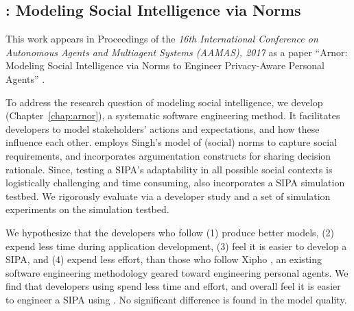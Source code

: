 \subsection[Modeling Social Intelligence via Norms]{\frameworkA: Modeling Social Intelligence via Norms}

This work appears in Proceedings of the \emph{16th International Conference on Autonomous Agents and Multiagent Systems (AAMAS), 2017} as a paper ``Arnor: Modeling Social Intelligence via Norms to Engineer Privacy-Aware Personal Agents'' \citep{Ajmeri-AAMAS17-Arnor}.

To address the research question of modeling social intelligence, we
develop \frameworkA (Chapter~\ref{chap:arnor}), a systematic 
software engineering method. It facilitates developers to model stakeholders' actions
and expectations, and how these influence each other. \frameworkA
employs Singh's  model of (social) norms to
capture social requirements, and incorporates argumentation constructs
\citep{BenchCapon-2007-Argumentation+AI} for sharing decision rationale.
Since, testing a SIPA's adaptability in all possible social contexts is
logistically challenging and time consuming, \frameworkA also
incorporates a SIPA simulation testbed. We rigorously evaluate
\frameworkA via a developer study and a set of simulation experiments on
the simulation testbed. 


We hypothesize that the developers who follow \frameworkA (1) produce
better models, (2) expend less time during application development, (3) feel it is easier to develop a
SIPA, and (4) expend less effort, than those who follow Xipho \cite{Murukannaiah-AAMAS14-Xipho}, an existing software engineering methodology geared toward engineering personal agents. We find
that developers using \frameworkA spend less time and effort, and
overall feel it is easier to engineer a SIPA using \frameworkA. No
significant difference is found in the model quality.

